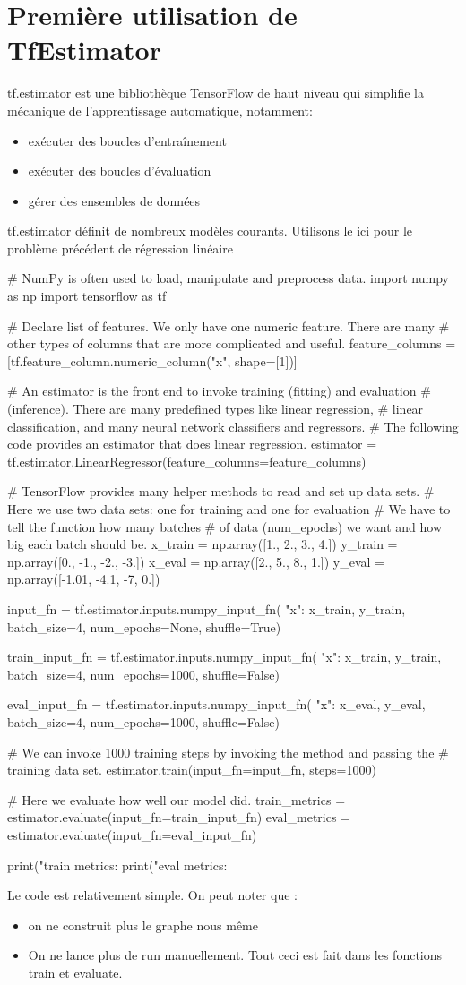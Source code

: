 \documentclass[a4paper,11pt]{book}
\theoremstyle{theo}
\begin{document}
\section{Première utilisation de TfEstimator}

tf.estimator est une bibliothèque TensorFlow de haut niveau qui simplifie la mécanique de l'apprentissage automatique, notamment:
\begin{itemize}
\item exécuter des boucles d'entraînement
\item exécuter des boucles d'évaluation
\item gérer des ensembles de données
\end{itemize}

tf.estimator définit de nombreux modèles courants.
Utilisons le ici pour le problème précédent de régression linéaire
\begin{mypython}
# NumPy is often used to load, manipulate and preprocess data.
import numpy as np
import tensorflow as tf

# Declare list of features. We only have one numeric feature. There are many
# other types of columns that are more complicated and useful.
feature_columns = [tf.feature_column.numeric_column("x", shape=[1])]

# An estimator is the front end to invoke training (fitting) and evaluation
# (inference). There are many predefined types like linear regression,
# linear classification, and many neural network classifiers and regressors.
# The following code provides an estimator that does linear regression.
estimator = tf.estimator.LinearRegressor(feature_columns=feature_columns)

# TensorFlow provides many helper methods to read and set up data sets.
# Here we use two data sets: one for training and one for evaluation
# We have to tell the function how many batches
# of data (num_epochs) we want and how big each batch should be.
x_train = np.array([1., 2., 3., 4.])
y_train = np.array([0., -1., -2., -3.])
x_eval = np.array([2., 5., 8., 1.])
y_eval = np.array([-1.01, -4.1, -7, 0.])

input_fn = tf.estimator.inputs.numpy_input_fn(
    {"x": x_train}, y_train, batch_size=4, num_epochs=None, shuffle=True)

train_input_fn = tf.estimator.inputs.numpy_input_fn(
    {"x": x_train}, y_train, batch_size=4, num_epochs=1000, shuffle=False)

eval_input_fn = tf.estimator.inputs.numpy_input_fn(
    {"x": x_eval}, y_eval, batch_size=4, num_epochs=1000, shuffle=False)

# We can invoke 1000 training steps by invoking the  method and passing the
# training data set.
estimator.train(input_fn=input_fn, steps=1000)

# Here we evaluate how well our model did.
train_metrics = estimator.evaluate(input_fn=train_input_fn)
eval_metrics = estimator.evaluate(input_fn=eval_input_fn)

print("train metrics: %
print("eval metrics: %
\end{mypython}

Le code est relativement simple. On peut noter que :
\begin{itemize}
\item on ne construit plus le graphe nous même
\item On ne lance plus de run manuellement. Tout ceci est fait dans les fonctions train et evaluate.
\end{itemize}
\end{document}

